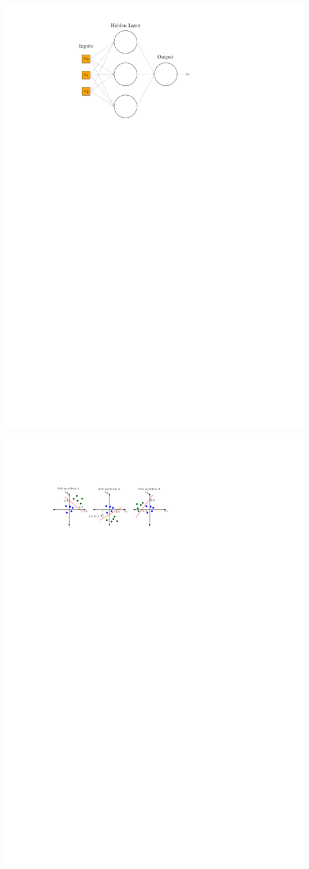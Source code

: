 \begin{qsolve}
	\begin{center}
		\includegraphics*[width=0.5\linewidth]{pics/img3.pdf}
		\label{معماری شبکه ۳ لایه پیشنهادی}
	\end{center}
	
	\begin{center}
		\includegraphics*[width=1\linewidth]{pics/img4.pdf}
		\label{داده های شکسته شده به سه بخش}
	\end{center}
\end{qsolve}


